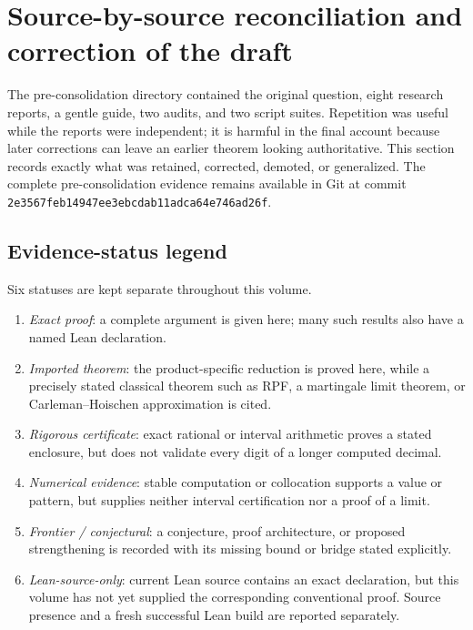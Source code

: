 \documentclass[11pt,oneside]{article}
\numberwithin{equation}{section}
\theoremstyle{definition}
\theoremstyle{remark}
\begin{document}
\section{Source-by-source reconciliation and correction of the draft}
\label{sec:source-reconciliation}

The pre-consolidation directory contained the original question, eight research reports, a
gentle guide, two audits, and two script suites.  Repetition was useful while the reports
were independent; it is harmful in the final account because later corrections can leave an
earlier theorem looking authoritative.  This section records exactly what was retained,
corrected, demoted, or generalized.  The complete pre-consolidation evidence remains
available in Git at commit
\texttt{2e3567feb14947ee3ebcdab11adca64e746ad26f}.

\subsection{Evidence-status legend}

Six statuses are kept separate throughout this volume.

\begin{enumerate}
\item \emph{Exact proof}: a complete argument is given here; many such results also have a
      named Lean declaration.
\item \emph{Imported theorem}: the product-specific reduction is proved here, while a
      precisely stated classical theorem such as RPF, a martingale limit theorem, or
      Carleman--Hoischen approximation is cited.
\item \emph{Rigorous certificate}: exact rational or interval arithmetic proves a stated
      enclosure, but does not validate every digit of a longer computed decimal.
\item \emph{Numerical evidence}: stable computation or collocation supports a value or
      pattern, but supplies neither interval certification nor a proof of a limit.
\item \emph{Frontier / conjectural}: a conjecture, proof architecture, or proposed
      strengthening is recorded with its missing bound or bridge stated explicitly.
\item \emph{Lean-source-only}: current Lean source contains an exact declaration, but this
      volume has not yet supplied the corresponding conventional proof.  Source presence
      and a fresh successful Lean build are reported separately.
\end{enumerate}
\end{document}
